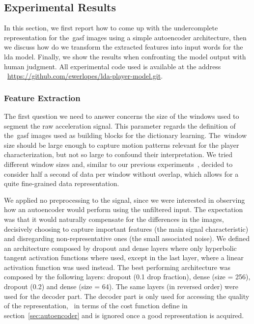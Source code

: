 \subsection{Experimental Results}
In this section, we first report how to come up with the undercomplete representation for the~\gls{gasf} images using a simple autoencoder architecture, then we discuss how do we transform the extracted features into input words for the \gls{lda} model. Finally, we show the results when confronting the model output with human judgment. All experimental code used is available at the address ~\url{https://github.com/ewerlopes/lda-player-model.git}.

\subsubsection{Feature Extraction}
The first question we need to answer concerns the size of the windows used to segment the raw acceleration signal. This parameter regards the definition of the~\gls{gasf} images used as building blocks for the dictionary learning. The~window size should be large enough to capture motion patterns relevant for the player characterization, but not so large to confound their interpretation. We tried different window sizes and, similar to our previous experiments~\citep{oliveira_activity_2017}, decided to consider half a second of data per window without overlap, which allows for a quite fine-grained data representation.

We applied no preprocessing to the signal, since we were interested in observing how an autoencoder would perform using the unfiltered input. The expectation was that it would naturally compensate for the differences in the images, decisively choosing to capture important features (the main signal characteristic) and disregarding non-representative ones (the small associated noise). We defined an architecture composed by dropout and dense layers where only hyperbolic tangent activation functions where used, except in the last layer, where a linear activation function was used instead. The best performing architecture was composed by the following layers: dropout (0.1 drop fraction), dense (size = 256), dropout (0.2) and dense (size = 64). The same layers (in reversed order) were used for the decoder part. The decoder part is only used for accessing the quality of the representation, ~\ie in terms of the cost function define in section~\ref{sec:autoencoder} and is ignored once a good representation is acquired.

